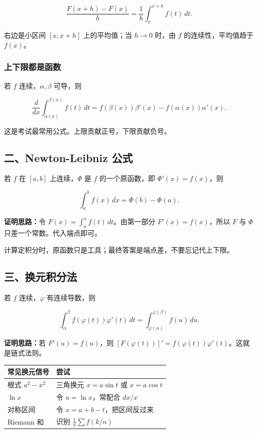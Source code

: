 \[
      \frac{F(x+h)-F(x)}{h}
      =
      \frac1h\int_x^{x+h}f(t)\,dt.
    \]

右边是小区间 \([x,x+h]\) 上的平均值；当 \(h\to0\) 时，由 \(f\) 的连续性，平均值趋于 \(f(x)\)。

\subsubsection*{上下限都是函数}

若 \(f\) 连续，\(\alpha,\beta\) 可导，则

\[
      \frac{d}{dx}\int_{\alpha(x)}^{\beta(x)}f(t)\,dt
      =
      f(\beta(x))\beta'(x)-f(\alpha(x))\alpha'(x).
    \]

这是考试最常用公式。上限贡献正号，下限贡献负号。

\subsection*{二、Newton-Leibniz 公式}

若 \(f\) 在 \([a,b]\) 上连续，\(\Phi\) 是 \(f\) 的一个原函数，即 \(\Phi'(x)=f(x)\)，则

\[
      \int_a^b f(x)\,dx=\Phi(b)-\Phi(a).
    \]

\textbf{证明思路：}令 \(F(x)=\int_a^x f(t)\,dt\)。由第一部分 \(F'(x)=f(x)\)，所以 \(F\) 与 \(\Phi\) 只差一个常数。代入端点即可。

\begin{notebox}
计算定积分时，原函数只是工具；最终答案是端点差，不要忘记代上下限。
\end{notebox}

\subsection*{三、换元积分法}

若 \(f\) 连续，\(\varphi\) 有连续导数，则

\[
      \int_\alpha^\beta f(\varphi(t))\varphi'(t)\,dt
      =
      \int_{\varphi(\alpha)}^{\varphi(\beta)} f(u)\,du.
    \]

\textbf{证明思路：}若 \(F'(u)=f(u)\)，则 \([F(\varphi(t))]'=f(\varphi(t))\varphi'(t)\)。这就是链式法则。

\begin{center}
\small
\begin{tabularx}{\linewidth}{|>{\raggedright\arraybackslash}X|>{\raggedright\arraybackslash}X|}
\hline
\textbf{常见换元信号} & \textbf{尝试} \\ \hline
根式 \(a^2-x^2\) & 三角换元 \(x=a\sin t\) 或 \(x=a\cos t\) \\ \hline
\(\ln x\) & 令 \(u=\ln x\)，常配合 \(dx/x\) \\ \hline
对称区间 & 令 \(x=a+b-t\)，把区间反过来 \\ \hline
Riemann 和 & 识别 \(\frac1n\sum f(k/n)\) \\ \hline
\end{tabularx}
\end{center}

